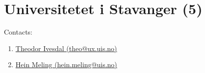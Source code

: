 


\section{Universitetet i Stavanger (5)}
\label{sec:UiS}

Contacts:
\begin{enumerate}
 \item {}\href{mailto:theo@ux.uis.no}{Theodor Ivesdal (theo@ux.uis.no)}
 \item {}\href{mailto:hein.meling@uis.no}{Hein Meling (hein.meling@uis.no)}
\end{enumerate}

